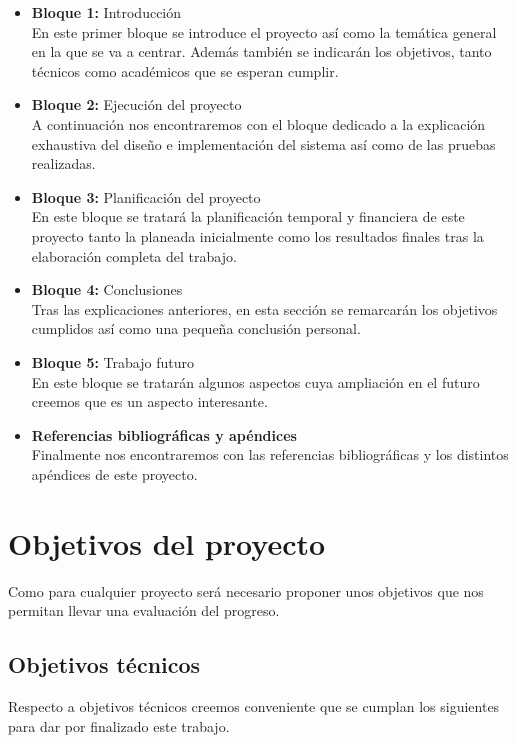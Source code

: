 \begin{itemize}
    \item \textbf{Bloque 1:} Introducción\\
        En este primer bloque se introduce el proyecto así como la temática general en la que se va a centrar. Además también se indicarán los objetivos, tanto técnicos como académicos que se esperan cumplir.

    \item \textbf{Bloque 2:} Ejecución del proyecto\\
        A continuación nos encontraremos con el bloque dedicado a la explicación exhaustiva del diseño e implementación del sistema así como de las pruebas realizadas.

    \item \textbf{Bloque 3:} Planificación del proyecto\\
        En este bloque se tratará la planificación temporal y financiera de este proyecto tanto la planeada inicialmente como los resultados finales tras la elaboración completa del trabajo. 

    \item \textbf{Bloque 4:} Conclusiones\\
        Tras las explicaciones anteriores, en esta sección se remarcarán los objetivos cumplidos así como una pequeña conclusión personal.

    \item \textbf{Bloque 5:} Trabajo futuro\\
        En este bloque se tratarán algunos aspectos cuya ampliación en el futuro creemos que es un aspecto interesante.

    \item \textbf{Referencias bibliográficas y apéndices}\\
        Finalmente nos encontraremos con las referencias bibliográficas y los distintos apéndices de este proyecto.
\end{itemize}


\section{Objetivos del proyecto}\label{sec:Objetivos}

Como para cualquier proyecto será necesario proponer unos objetivos que nos permitan llevar una evaluación del progreso.

\subsection{Objetivos técnicos}
Respecto a objetivos técnicos creemos conveniente que se cumplan los siguientes para dar por finalizado este trabajo.

